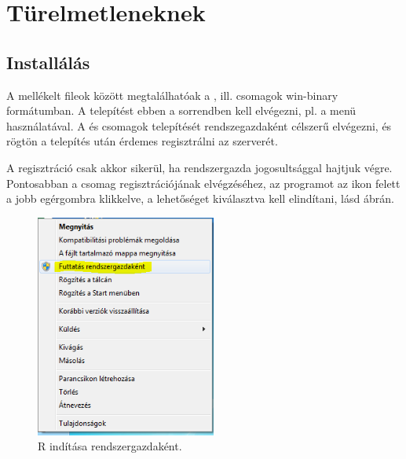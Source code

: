
\chapter{Türelmetleneknek}

\section{Installálás}
\label{sec:1.1}


A mellékelt fileok között megtalálhatóak a , 
ill.  csomagok win-binary formátumban. A telepítést ebben a
sorrendben kell elvégezni, pl. a menü használatával.   
A  és  csomagok telepítését rendszegazdaként célszerű
elvégezni, és rögtön a telepítés után érdemes regisztrálni az 
 szerverét. 

A regisztráció csak akkor sikerül, ha rendszergazda jogosultsággal
hajtjuk végre. Pontosabban a  csomag regisztrációjának
elvégzéséhez, az  programot az ikon felett a jobb 
egérgombra klikkelve, a  lehetőséget
kiválasztva kell elindítani, lásd  ábrán.
\begin{figure}[h]
  \centering
  \includegraphics[width=16em]{images/start-as-root}
  \caption{R indítása rendszergazdaként.}
  \label{fig:1.1}
\end{figure}

